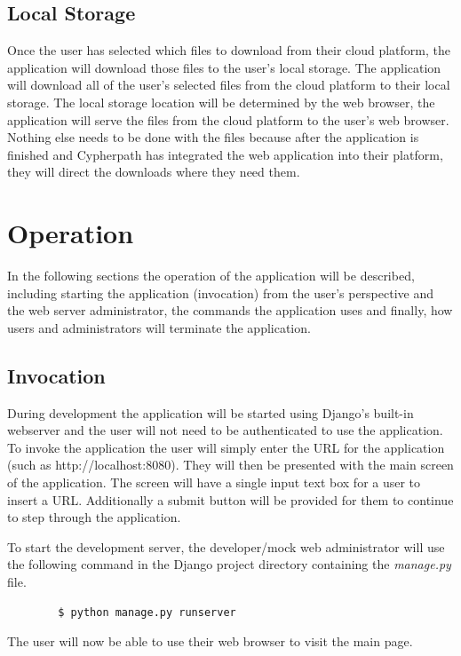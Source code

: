 \documentclass{article}
\begin{document}
        \subsection{Local Storage}
        Once the user has selected which files to download from their cloud platform, the application will download those
        files to the user's local storage. The application will download all of the user's selected files from the cloud platform to their local storage.
        The local storage location will be determined by the web browser, the application will serve the files from the cloud platform to the user's web browser. Nothing else 
        needs to be done with the files because after the application is finished and Cypherpath has integrated the web application into 
        their platform, they will direct the downloads where they need them.


    \section{Operation}
    In the following sections the operation of the application will be described, including starting the application
    (invocation) from the user's perspective and the web server administrator, the commands the application uses and finally, how users and administrators will terminate the application.

        \subsection{Invocation}
        During development the application will be started using Django's built-in webserver and
        the user will not need to be authenticated to use the application. To invoke the application the user will simply enter the URL for the application (such as http://localhost:8080).
        They will then be presented with the main screen of the application. The screen will have a single input text box for a user to insert a URL. Additionally 
        a submit button will be provided for them to continue to step through the application. 

        To start the development server, the developer/mock web administrator will use the following command in the Django project directory containing the \textit{manage.py} file.
        \begin{verbatim}
        $ python manage.py runserver
        \end{verbatim}

        The user will now be able to use their web browser to visit the main page.
\end{document}
